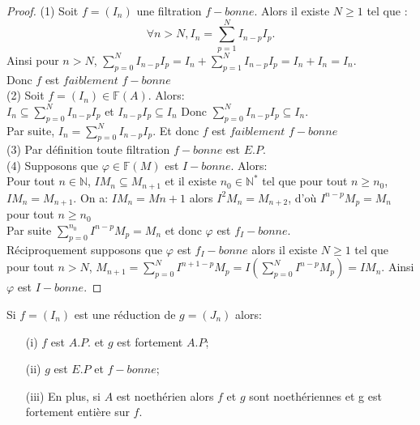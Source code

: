 \begin{proof}
	(1) Soit $f=(I_n)$ une filtration $f-bonne$. Alors il existe $N \geqslant 1$ tel que :
	\[ \forall n > N, I_n = \sum\limits_{p=1}^{N} I_{n-p}I_p. \]
	Ainsi pour $n> N$, $\sum\limits_{p=0}^{N} I_{n-p}I_p =  I_n + \sum\limits_{p=1}^{N} I_{n-p}I_p = I_n + I_n = I_n$. \\
	Donc $f$ est $faiblement$ $f-bonne$ \\
	(2) Soit $f=(I_n) \in \mathbb{F}(A)$. Alors:\\
	$I_n \subseteq \sum\limits_{p=0}^{N} I_{n-p}I_p$ et $ I_{n-p}I_p \subseteq I_n$
	Donc $\sum\limits_{p=0}^{N}I_{n-p}I_p \subseteq I_n$. \\ Par suite, $I_n = \sum\limits_{p=0}^{N} I_{n-p}I_p.$ Et donc $f$ est $faiblement$ $f-bonne$ \\
	(3) Par définition toute filtration $f-bonne$ est $E.P$. \\
	(4) Supposons que $\varphi \in \mathbb{F}(M)$ est $I-bonne$. Alors: \\
	Pour tout $n \in \mathbb{N}$, $IM_n \subseteq M_{n+1}$ et il existe $n_0 \in \mathbb{N}^{*}$ tel que pour tout $n \geqslant n_0$, $IM_n = M_{n+1}$.
	On a: $IM_n=M{n+1}$ alors $I^{2}M_n=M_{n+2}$, d'où $I^{n-p}M_p=M_n$ pour tout $n \geqslant n_0$\\ Par suite $\sum\limits_{p=0}^{n_0}I^{n-p}M_p=M_n$ et donc $\varphi$ est $f_{I}-bonne$. \\
	Réciproquement supposons que $\varphi$ est $f_{I}-bonne$ alors il existe $N \geqslant 1$ tel que pour tout $n> N$, $M_{n+1} = \sum\limits_{p=0}^{N}I^{n+1-p}M_p =I(\sum\limits_{p=0}^{N}I^{n-p}M_p ) = IM_n$. Ainsi $\varphi$ est $I-bonne$.	
	
\end{proof}
\begin{maproposition}
	\label{maprop7}
	Si $f=(I_n)$ est une réduction de $g=(J_n)$ alors:
	\begin{enumerate}
		\item[(i)] $f$ est $A.P.$ et $g$ est fortement $A.P$;
		\item[(ii)] $g$ est $E.P$ et $f-bonne$;
		\item[(iii)] En plus, si $A$ est noethérien alors $f$ et $g$ sont noethériennes et g est fortement entière sur $f$.
	\end{enumerate}
\end{maproposition}
